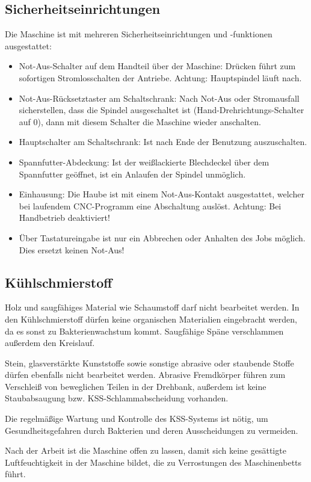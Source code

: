 \documentclass{\basedir/fablab-document}
\begin{document}
\subsection{Sicherheitseinrichtungen}
Die Maschine ist mit mehreren Sicherheitseinrichtungen und -funktionen ausgestattet:
\begin{itemize}
	\item Not-Aus-Schalter auf dem Handteil über der Maschine: Drücken führt zum sofortigen Stromlosschalten der Antriebe. Achtung: Hauptspindel läuft nach.
	\item Not-Aus-Rücksetztaster am Schaltschrank: Nach Not-Aus oder Stromausfall sicherstellen, dass die Spindel ausgeschaltet ist (Hand-Drehrichtungs-Schalter auf 0), dann mit diesem Schalter die Maschine wieder anschalten.
	\item Hauptschalter am Schaltschrank: Ist nach Ende der Benutzung auszuschalten.
	\item Spannfutter-Abdeckung: Ist der weißlackierte Blechdeckel über dem Spannfutter geöffnet, ist ein Anlaufen der Spindel unmöglich.
	\item Einhausung: Die Haube ist mit einem Not-Aus-Kontakt ausgestattet, welcher bei laufendem CNC-Programm eine Abschaltung auslöst. Achtung: Bei Handbetrieb deaktiviert!
	\item Über Tastatureingabe ist nur ein Abbrechen oder Anhalten des Jobs möglich. Dies ersetzt keinen Not-Aus!
\end{itemize}

\subsection{Kühlschmierstoff}

Holz und saugfähiges Material wie Schaumstoff darf nicht bearbeitet werden. In den Kühlschmierstoff dürfen keine organischen Materialien eingebracht werden, da es sonst zu Bakterienwachstum kommt. Saugfähige Späne verschlammen außerdem den Kreislauf.

Stein, glasverstärkte Kunststoffe sowie sonstige abrasive oder staubende Stoffe dürfen ebenfalls nicht bearbeitet werden. Abrasive Fremdkörper führen zum Verschleiß von beweglichen Teilen in der Drehbank, außerdem ist keine Staubabsaugung bzw. KSS-Schlammabscheidung vorhanden.

Die regelmäßige Wartung und Kontrolle des KSS-Systems ist nötig, um Gesundheitsgefahren durch Bakterien und deren Ausscheidungen zu vermeiden.

Nach der Arbeit ist die Maschine offen zu lassen, damit sich keine gesättigte Luftfeuchtigkeit in der Maschine bildet, die zu Verrostungen des Maschinenbetts führt.
\end{document}

